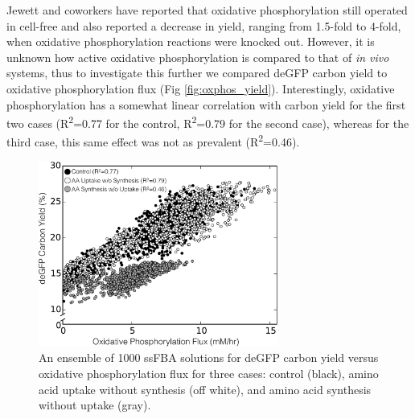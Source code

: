 \documentclass[journal=asbcd6,manuscript=article]{achemso}
\begin{document}
Jewett and coworkers have reported that oxidative phosphorylation still operated in cell-free and also reported a decrease in yield, ranging from 1.5-fold to 4-fold, when oxidative phosphorylation reactions were knocked out\cite{Jewett:2008aa}.
However, it is unknown how active oxidative phosphorylation is compared to that of \textit{in vivo} systems, thus to investigate this further we compared deGFP carbon yield to oxidative phosphorylation flux (Fig \ref{fig:oxphos_yield}).
Interestingly, oxidative phosphorylation has a somewhat linear correlation with carbon yield for the first two cases (R\textsuperscript{2}=0.77 for the control, R\textsuperscript{2}=0.79 for the second case), whereas for the third case, this same effect was not as prevalent (R\textsuperscript{2}=0.46).
\begin{figure}[t!]
\includegraphics[width=0.7\textwidth]{./Figures/OxPhos_yield.pdf}
\caption{An ensemble of 1000 ssFBA solutions for deGFP carbon yield versus oxidative phosphorylation flux for three cases: control (black), amino acid uptake without synthesis (off white), and amino acid synthesis without uptake (gray). }
\label{fig:oxphos}
\end{figure}
\end{document}
